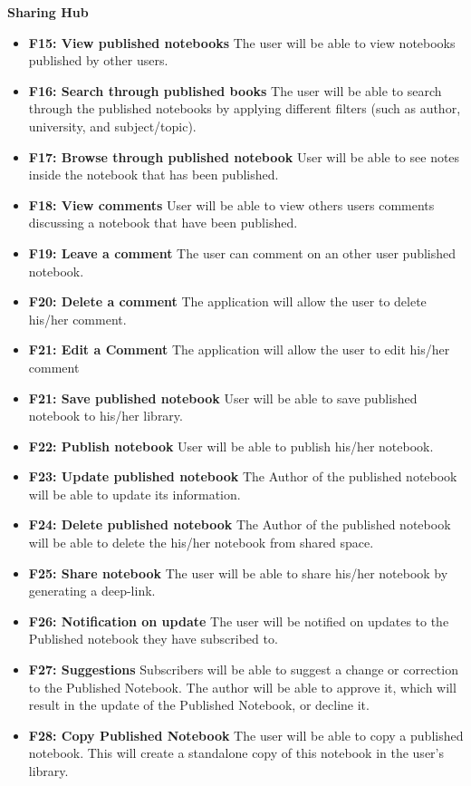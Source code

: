 \documentclass[thesis=B,english]{FITthesis}[2012/10/20]
\begin{document}
\bigskip
\textbf{Sharing Hub}
\begin{itemize}
	\item \textbf{F15: View published notebooks} The user will be able to view notebooks published by other users.
	\item \textbf{F16: Search through published books} The user will be able to search through the published notebooks by applying different filters (such as author, university, and subject/topic).
	\item \textbf{F17: Browse through published notebook} User will be able to see notes inside the notebook that has been published.
	\item \textbf{F18: View comments} User will be able to view others users comments discussing a notebook that have been published.
	\item \textbf{F19: Leave a comment} The user can comment on an other user published notebook.
	\item \textbf{F20: Delete a comment} The application will allow the user to delete his/her comment.
	\item \textbf{F21: Edit a Comment} The application will allow the user to edit his/her comment
	\item \textbf{F21: Save published notebook} User will be able to save published notebook to his/her library.
	\item \textbf{F22: Publish notebook} User will be able to publish his/her notebook.
	\item \textbf{F23: Update published notebook} The Author of the published notebook will be able to update its information.
	\item \textbf{F24: Delete published notebook} The Author of the published notebook will be able to delete the his/her notebook from shared space.
	\item \textbf{F25: Share notebook} The user will be able to share his/her notebook by generating a deep-link.
	\item \textbf{F26: Notification on update} The user will be notified on updates to the Published notebook they have subscribed to.
	\item \textbf{F27: Suggestions} Subscribers will be able to suggest a change or correction to the Published Notebook. The author will be able to approve it, which will result in the update of the Published Notebook, or decline it.
	\item \textbf{F28: Copy Published Notebook} The user will be able to copy a published notebook. This will create a standalone copy of this notebook in the user's library.
 \end{itemize}
\end{document}
